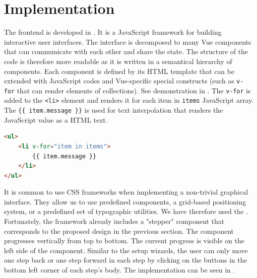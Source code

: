 \section{Implementation}
The frontend is developed in . It is a JavaScript framework for
building interactive user interfaces. The interface is decomposed to many Vue
components that can communicate with each other and share the state. The
structure of the code is therefore more readable as it is written in a
semantical hierarchy of components. Each component is defined by its HTML
template that can be extended with JavaScript codes and Vue-specific special
constructs (such as \texttt{v-for} that can render elements of collections). See
demonstration in . The \texttt{v-for} is added to the
\texttt{<li>} element and renders it for each item in \texttt{items} JavaScript
array. The \texttt{\{\{ item.message \}\}} is used for text interpolation that
renders the JavaScript value as a HTML text.

\begin{lstlisting}[language=HTML, caption=Vue.js template example]
<ul>
    <li v-for="item in items">
        {{ item.message }}
    </li>
</ul>
\end{lstlisting}
\label{code:vue}

It is common to use CSS frameworks when implementing a non-trivial graphical
interface. They allow us to use predefined components, a grid-based positioning
system, or a predefined set of typographic utilities. We have therefore used the
. Fortunately, the framework already
includes a "stepper" component that corresponds to the proposed design in the
previous section. The component progresses vertically from top to bottom. The
current progress is visible on the left side of the component. Similar to the
setup wizards, the user can only move one step back or one step forward in each
step by clicking on the buttons in the bottom left corner of each step's body.
The implementation can be seen in .

